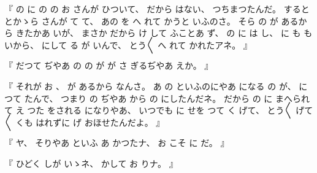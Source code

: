 %
『
の
に
の
の
お
さんが
ひついて、
%
だから
はない、
%
つちまつたんだ。
%
すると
とかゝら
さんが
て
て、
%
あの
を
へ
れて
かうと
いふのさ。
%
そら
の
が
あるから
きたかあ
いが、
%
まさか
だから
け
して
ふことあ
ず、
%
の
に
は
し、
%
に
も
も
%
いから、
%
にして
る
が
いんで、
%
とう〳〵
へ
れて
かれたアネ。
』

%
『
だつて
ぢやあ
の
の
が
が
さ
ぎるぢやあ
えか。
』

%
『
それが
お
、
%
が
あるから
なんさ。
%
あ
の
といふのにやあ
になる
の
が、
%
に
つて
たんで、
%
つまり
の
ぢやあ
から
の
にしたんだネ。
%
だから
の
に
まへられて
え
つた
をされる
になりやあ、
%
いつでも
に
%
せを
つて
く
げて、
%
とう〳〵
げて〳〵
くも
はれずに
げ
おほせたんだよ。
』

%
『
ヤ、
%
そりやあ
といふ
あ
かつたナ、
%
お
こそ
に
%
だ。
』

%
『
ひどく
しが
いゝネ、
%
かして
お
りナ。
』

